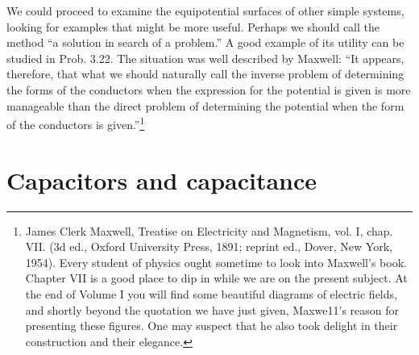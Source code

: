 We could proceed to examine the equipotential surfaces of other
simple systems, looking for examples that might be more useful.
Perhaps we should call the method ``a solution in search of a
problem.'' A good example of its utility can be studied in Prob. 3.22.
The situation was well described by Maxwell: ``It appears, therefore,
that what we should naturally call the inverse problem of determining
the forms of the conductors when the expression for the potential
is given is more manageable than the direct problem of determining
the potential when the form of the conductors is given.''\footnote{
James Clerk Maxwell, Treatise on Electricity and Magnetism, vol. I, chap. VII.
(3d ed., Oxford University Press, 1891; reprint ed., Dover, New York, 1954). Every
student of physics ought sometime to look into Maxwell's book. Chapter VII is a good
place to dip in while we are on the present subject. At the end of Volume I you will find
some beautiful diagrams of electric fields, and shortly beyond the quotation we have just
given, Maxwe11's reason for presenting these figures. One may suspect that he also took
delight in their construction and their elegance.}

\section{Capacitors and capacitance}

